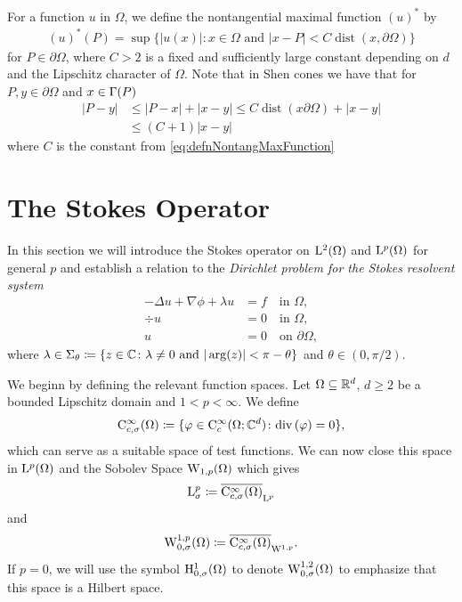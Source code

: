 For a function $u$ in $\Omega$, we define the nontangential maximal function $(u)^*$ by
\begin{align}
  \label{eq:defnNontangMaxFunction}
  (u)^*(P) = \sup\{ |u(x)| \colon x \in \Omega \text{ and } |x - P| < C \operatorname{dist}(x, \partial\Omega)\}
\end{align}
for $P \in \partial\Omega$, where $C > 2$ is a fixed and sufficiently large constant depending on $d$ and the Lipschitz character of $\Omega$.
Note that in Shen cones we have that for $P, y \in \partial\Omega$ and $x \in \Gamma(P)$
\begin{align}
  \label{eq:shenConeEstimate}
  |P - y| 
  &\leq |P - x| + |x - y| 
  \leq C \operatorname{dist}(x \partial\Omega) + |x - y|  \nonumber\\
  &\leq (C + 1) |x - y|
\end{align}
where $C$ is the constant from \eqref{eq:defnNontangMaxFunction}

\section{The Stokes Operator}

In this section we will introduce the Stokes operator on $\mathrm{L}^2(\Omega)$ and $\mathrm{L}^p(\Omega)$ for general $p$ and establish a relation to the \emph{Dirichlet problem for the Stokes resolvent system}
\begin{align}
  -\Delta u + \nabla \phi + \lambda u &= f  \quad\text{in } \Omega, \nonumber\\
  \div u &= 0 \quad\text{in } \Omega, \label{eq:stokesResolventSystem} \\
  u &= 0 \quad\text{on } \partial\Omega, \nonumber
\end{align}
where $\lambda \in \Sigma_\theta \coloneqq \{ z \in \mathbb{C} \colon \lambda \neq 0 \text{ and } |\arg(z) | < \pi - \theta \}$ and $\theta \in (0, \pi/2)$.

We beginn by defining the relevant function spaces.
Let $\Omega \subseteq \mathbb{R}^d$, $d \geq 2$ be a bounded Lipschitz domain and $1 < p < \infty$. 
We define
\begin{align*}
  \mathrm{C}_{c, \sigma}^\infty(\Omega) \coloneqq \{ \varphi \in \mathrm{C}_c^\infty(\Omega; \mathbb{C}^d) \colon \mathrm{div\,} (\varphi) = 0 \},
\end{align*}
which can serve as a suitable space of test functions.
We can now close this space in $\mathrm{L}^p(\Omega)$ and the Sobolev Space $\mathrm{W}_{1,p}(\Omega)$ which gives
\begin{align*}
  \mathrm{L}_\sigma^p \coloneqq \overline{\mathrm{C}_{c,\sigma}^\infty(\Omega)}_{\mathrm{L}^p}
\end{align*}
and
\begin{align*}
  \mathrm{W}_{0,\sigma}^{1,p}(\Omega) \coloneqq \overline{\mathrm{C}_{c,\sigma}^\infty(\Omega)}_{\mathrm{W}^{1,p}}.
\end{align*}
If $p = 0$, we will use the symbol $\mathrm{H}_{0,\sigma}^1(\Omega)$ to denote $\mathrm{W}_{0,\sigma}^{1,2}(\Omega)$ to emphasize that this space is a Hilbert space.


